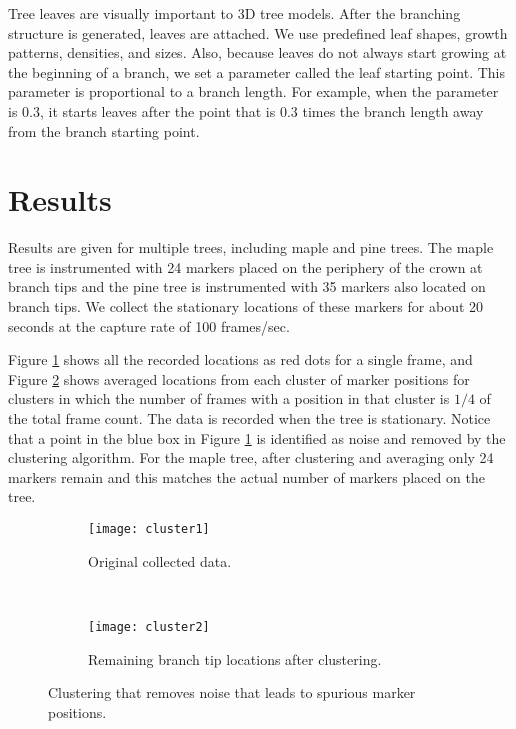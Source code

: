 Tree leaves are visually important to 3D tree models. After the branching structure is generated, leaves are attached. We use predefined leaf shapes, growth patterns, densities, and sizes. Also, because leaves do not always start growing at the beginning of a branch, we set a parameter called the leaf starting point. This parameter is proportional to a branch length. For example, when the parameter is $0.3$, it starts leaves after the point that is $0.3$ times the branch length away from the branch starting point. 

\section{Results}

Results are given for multiple trees, including maple and pine trees. The maple tree is instrumented with 24 markers placed on the periphery of the crown at branch tips and the pine tree is instrumented with 35 markers also located on branch tips. We collect the stationary locations of these markers for about 20 seconds at the capture rate of 100 frames/sec.

Figure \ref{fig:clustersubfig1} shows all the recorded locations as red dots for a single frame, and Figure \ref{fig:clustersubfig2} shows averaged locations from each cluster of marker positions for clusters in which the number of frames with a position in that cluster is $1/4$ of the total frame count. The data is recorded when the tree is stationary. Notice that a point in the blue box in Figure \ref{fig:clustersubfig1} is identified as noise and removed by the clustering algorithm. For the maple tree, after clustering and averaging only 24 markers remain and this matches the actual number of markers placed on the tree.

\begin{figure}
\centering
        \begin{subfigure}[b]{0.4\textwidth}
                \centering
                \texttt{[image: cluster1]}
                \caption{Original collected data.}
                \label{fig:clustersubfig1}
        \end{subfigure}
        ~
        \begin{subfigure}[b]{0.4\textwidth}
                \centering
                \texttt{[image: cluster2]}
                \caption{Remaining branch tip locations after clustering.}
                \label{fig:clustersubfig2}
        \end{subfigure}     
        \caption{Clustering that removes noise that leads to spurious marker positions.}
        \label{fig:cluster}
\end{figure}

